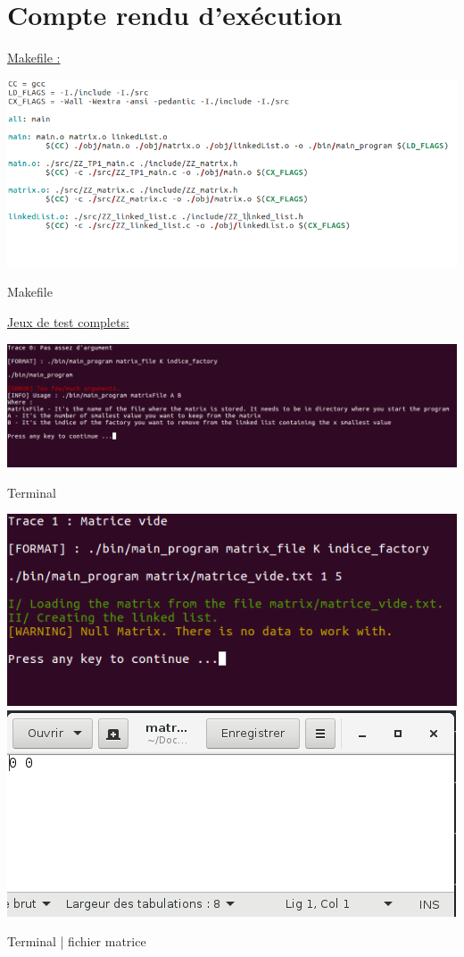 \documentclass[a4paper]{article}
\begin{document}
\section{Compte rendu d'exécution}

\underline{Makefile :}
\begin{center}
\includegraphics[scale=0.39]{Makefile.png}

Makefile
\end{center}

\underline{Jeux de test complets:}
\begin{center}
\includegraphics[scale=0.4]{trace_1.png}

Terminal
\end{center}

\begin{center}
\includegraphics[scale=0.4]{trace_2.png}
\includegraphics[scale=0.4]{matrice_vide.png}

Terminal | fichier matrice
\end{center}
\end{document}
